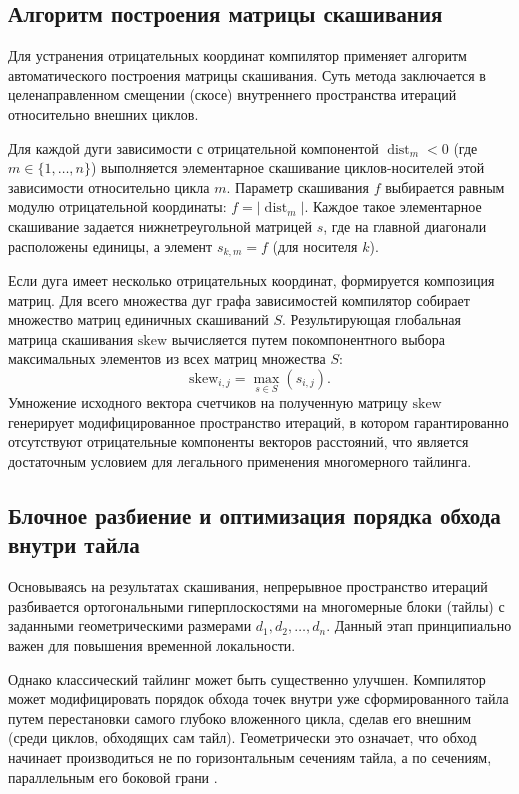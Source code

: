 \documentclass[14pt, russian]{scrartcl}
\begin{document}
\subsection{Алгоритм построения матрицы скашивания}

Для устранения отрицательных координат компилятор применяет алгоритм автоматического построения матрицы скашивания. Суть метода заключается в целенаправленном смещении (скосе) внутреннего пространства итераций относительно внешних циклов.

Для каждой дуги зависимости с отрицательной компонентой $\operatorname{dist}_m < 0$ (где $m \in \{1, \dots, n\}$) выполняется элементарное скашивание циклов-носителей этой зависимости относительно цикла $m$. Параметр скашивания $f$ выбирается равным модулю отрицательной координаты: $f = |\operatorname{dist}_m|$. Каждое такое элементарное скашивание задается нижнетреугольной матрицей $s$, где на главной диагонали расположены единицы, а элемент $s_{k, m} = f$ (для носителя $k$).

Если дуга имеет несколько отрицательных координат, формируется композиция матриц. Для всего множества дуг графа зависимостей компилятор собирает множество матриц единичных скашиваний $S$. Результирующая глобальная матрица скашивания $\mathrm{skew}$ вычисляется путем покомпонентного выбора максимальных элементов из всех матриц множества $S$:
\begin{equation}
\label{eq:skew_matrix}
\mathrm{skew}_{i,j} = \max_{s \in S} (s_{i,j}).
\end{equation}
Умножение исходного вектора счетчиков на полученную матрицу $\mathrm{skew}$ генерирует модифицированное пространство итераций, в котором гарантированно отсутствуют отрицательные компоненты векторов расстояний, что является достаточным условием для легального применения многомерного тайлинга.

\subsection{Блочное разбиение и оптимизация порядка обхода внутри тайла}

Основываясь на результатах скашивания, непрерывное пространство итераций разбивается ортогональными гиперплоскостями на многомерные блоки (тайлы) с заданными геометрическими размерами $d_1, d_2, \dots, d_n$. Данный этап принципиально важен для повышения временной локальности.

Однако классический тайлинг может быть существенно улучшен. Компилятор может модифицировать порядок обхода точек внутри уже сформированного тайла путем перестановки самого глубоко вложенного цикла, сделав его внешним (среди циклов, обходящих сам тайл). Геометрически это означает, что обход начинает производиться не по горизонтальным сечениям тайла, а по сечениям, параллельным его боковой грани \cite{metelica2024}.
\end{document}
